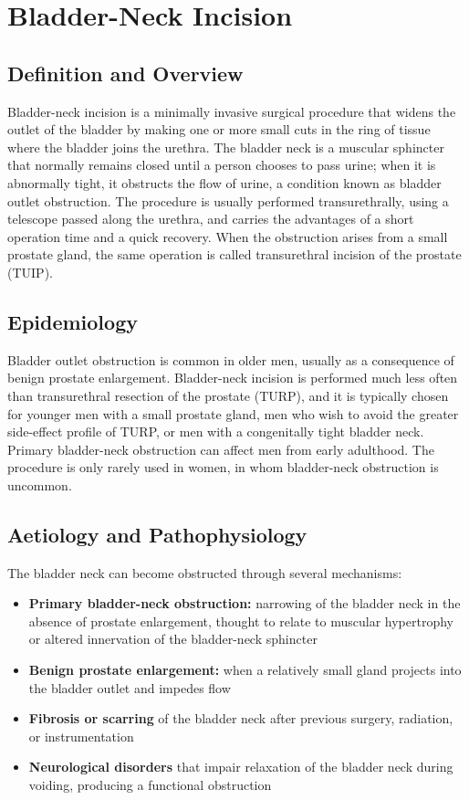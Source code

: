 \chapter{Bladder-Neck Incision}

\section*{Definition and Overview}
Bladder-neck incision is a minimally invasive surgical procedure that widens the outlet of the bladder by making one or more small cuts in the ring of tissue where the bladder joins the urethra. The bladder neck is a muscular sphincter that normally remains closed until a person chooses to pass urine; when it is abnormally tight, it obstructs the flow of urine, a condition known as bladder outlet obstruction. The procedure is usually performed transurethrally, using a telescope passed along the urethra, and carries the advantages of a short operation time and a quick recovery. When the obstruction arises from a small prostate gland, the same operation is called transurethral incision of the prostate (TUIP).

\section*{Epidemiology}
Bladder outlet obstruction is common in older men, usually as a consequence of benign prostate enlargement. Bladder-neck incision is performed much less often than transurethral resection of the prostate (TURP), and it is typically chosen for younger men with a small prostate gland, men who wish to avoid the greater side-effect profile of TURP, or men with a congenitally tight bladder neck. Primary bladder-neck obstruction can affect men from early adulthood. The procedure is only rarely used in women, in whom bladder-neck obstruction is uncommon.

\section*{Aetiology and Pathophysiology}
The bladder neck can become obstructed through several mechanisms:

\begin{itemize}
    \item \textbf{Primary bladder-neck obstruction:} narrowing of the bladder neck in the absence of prostate enlargement, thought to relate to muscular hypertrophy or altered innervation of the bladder-neck sphincter
    \item \textbf{Benign prostate enlargement:} when a relatively small gland projects into the bladder outlet and impedes flow
    \item \textbf{Fibrosis or scarring} of the bladder neck after previous surgery, radiation, or instrumentation
    \item \textbf{Neurological disorders} that impair relaxation of the bladder neck during voiding, producing a functional obstruction
\end{itemize}

